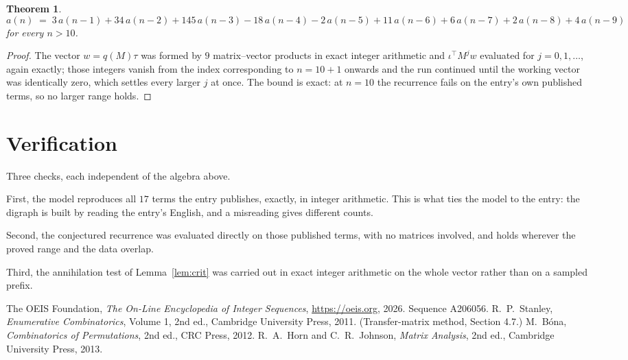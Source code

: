 \documentclass[11pt,a4paper]{article}
\theoremstyle{plain}
\newtheorem{theorem}{Theorem}
\theoremstyle{definition}
\begin{document}
\begin{theorem}
\[
a(n)\;=\;3\,a(n-1) + 34\,a(n-2) + 145\,a(n-3) - 18\,a(n-4) - 2\,a(n-5) + 11\,a(n-6) + 6\,a(n-7) + 2\,a(n-8) + 4\,a(n-9)
\]
for every $n>10$.
\end{theorem}

\begin{proof}
The vector $w=q(M)\tau$ was formed by $9$ matrix--vector products in exact integer
arithmetic and $\iota^{\!\top}M^{j}w$ evaluated for $j=0,1,\dots$, again exactly; those
integers vanish from the index corresponding to $n=10+1$ onwards and the run continued
until the working vector was identically zero, which settles every larger $j$ at once. The bound is exact: at $n=10$ the recurrence fails on the entry's own published terms, so no larger range holds.
\end{proof}

\section{Verification}

Three checks, each independent of the algebra above.

First, the model reproduces all $17$ terms the entry publishes, exactly, in integer
arithmetic. This is what ties the model to the entry: the digraph is built by reading the
entry's English, and a misreading gives different counts.

Second, the conjectured recurrence was evaluated directly on those published terms, with no
matrices involved, and holds wherever the proved range and the data overlap.

Third, the annihilation test of Lemma~\ref{lem:crit} was carried out in exact integer
arithmetic on the whole vector rather than on a sampled prefix.

\begin{thebibliography}{9}
 The OEIS Foundation, \emph{The On-Line Encyclopedia of Integer
Sequences}, \url{https://oeis.org}, 2026. Sequence A206056.
 R.~P.~Stanley, \emph{Enumerative Combinatorics}, Volume 1, 2nd ed.,
Cambridge University Press, 2011. (Transfer-matrix method, Section 4.7.)
 M.~B\'ona, \emph{Combinatorics of Permutations}, 2nd ed., CRC
Press, 2012.
 R.~A.~Horn and C.~R.~Johnson, \emph{Matrix Analysis}, 2nd ed., Cambridge
University Press, 2013.
\end{thebibliography}
\end{document}
